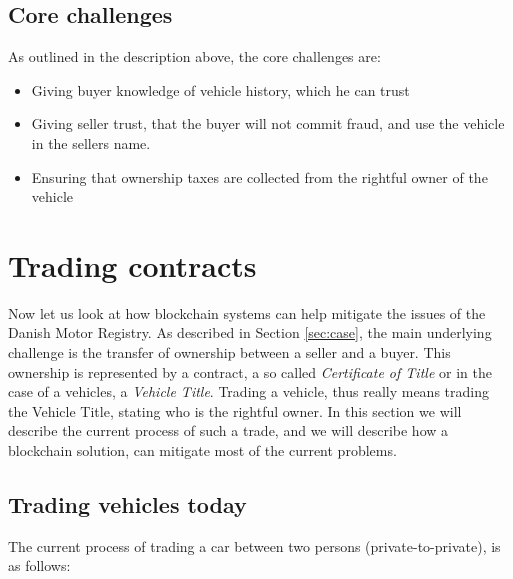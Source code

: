 \documentclass[oneside,a4paper,10pts,article]{memoir}
\begin{document}
\section{Core challenges}
As outlined in the description above, the core challenges are:

\begin{itemize}
\item Giving buyer knowledge of vehicle history, which he can trust
\item Giving seller trust, that the buyer will not commit fraud, and
  use the vehicle in the sellers name.
\item Ensuring that ownership taxes are collected from the rightful
  owner of the vehicle
\end{itemize}


\chapter{Trading contracts}
\label{sec:trading}
Now let us look at how blockchain systems can help mitigate the issues
of the Danish Motor Registry. As described in Section \ref{sec:case},
the main underlying challenge is the transfer of ownership between a
seller and a buyer. This ownership is represented by a contract, a so
called \emph{Certificate of Title} or in the case of a vehicles, a
\emph{Vehicle Title}. Trading a vehicle, thus really means trading the
Vehicle Title, stating who is the rightful owner. In this section we
will describe the current process of such a trade, and we will
describe how a blockchain solution, can mitigate most of the current
problems.

\section{Trading vehicles today}
The current process of trading a car between two persons
(private-to-private), is as follows:
\end{document}
